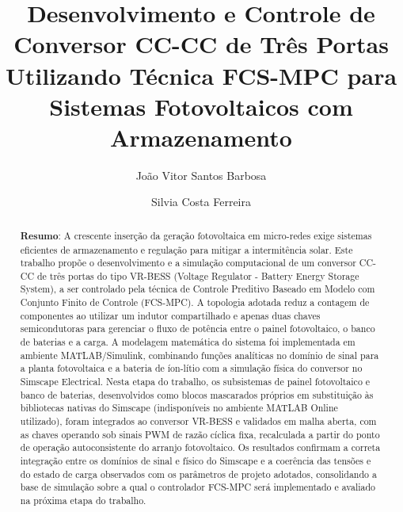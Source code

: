 \documentclass[a4paper]{ifacconf}
\begin{document}
\begin{frontmatter}

\title{Desenvolvimento e Controle de Conversor CC-CC de Três Portas Utilizando Técnica FCS-MPC para Sistemas Fotovoltaicos com Armazenamento}

\author[First]{João Vitor Santos Barbosa}
\author[First]{Silvia Costa Ferreira}

\address[First]{Departamento de Automática, Universidade Federal de Lavras, MG.}

\renewcommand{\abstractname}{} %
\begin{abstract}
{\noindent \bf Resumo}:
A crescente inserção da geração fotovoltaica em micro-redes exige sistemas eficientes de armazenamento e regulação para mitigar a intermitência solar. Este trabalho propõe o desenvolvimento e a simulação computacional de um conversor CC-CC de três portas do tipo VR-BESS (Voltage Regulator - Battery Energy Storage System), a ser controlado pela técnica de Controle Preditivo Baseado em Modelo com Conjunto Finito de Controle (FCS-MPC). A topologia adotada reduz a contagem de componentes ao utilizar um indutor compartilhado e apenas duas chaves semicondutoras para gerenciar o fluxo de potência entre o painel fotovoltaico, o banco de baterias e a carga. A modelagem matemática do sistema foi implementada em ambiente MATLAB/Simulink, combinando funções analíticas no domínio de sinal para a planta fotovoltaica e a bateria de íon-lítio com a simulação física do conversor no Simscape Electrical. Nesta etapa do trabalho, os subsistemas de painel fotovoltaico e banco de baterias, desenvolvidos como blocos mascarados próprios em substituição às bibliotecas nativas do Simscape (indisponíveis no ambiente MATLAB Online utilizado), foram integrados ao conversor VR-BESS e validados em malha aberta, com as chaves operando sob sinais PWM de razão cíclica fixa, recalculada a partir do ponto de operação autoconsistente do arranjo fotovoltaico. Os resultados confirmam a correta integração entre os domínios de sinal e físico do Simscape e a coerência das tensões e do estado de carga observados com os parâmetros de projeto adotados, consolidando a base de simulação sobre a qual o controlador FCS-MPC será implementado e avaliado na próxima etapa do trabalho.


\end{abstract}
\end{frontmatter}
\end{document}

